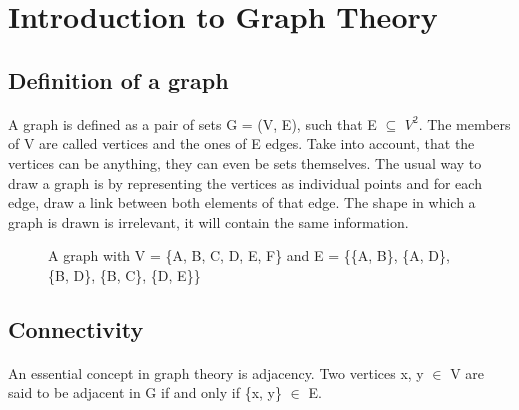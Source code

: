 \section{Introduction to Graph Theory}

\subsection{Definition of a graph}
\paragraph{}
A graph is defined as a pair of sets G = (V, E), such that E $\subseteq$ $V^2$. The members of V are called vertices and the ones of E edges. Take into account, that the vertices can be anything, they can even be sets themselves. The usual way to draw a graph is by representing the vertices as individual points and for each edge, draw a link between both elements of that edge. The shape in which a graph is drawn is irrelevant, it will contain the same information.

\begin{figure}[h]

\caption{A graph with V = \{A, B, C, D, E, F\} and E = \{\{A, B\}, \{A, D\}, \{B, D\}, \{B, C\}, \{D, E\}\}}
\end{figure}

\subsection{Connectivity}
\paragraph{}
An essential concept in graph theory is adjacency. Two vertices x, y $\in$ V are said to be adjacent in G if and only if \{x, y\} $\in$ E.

